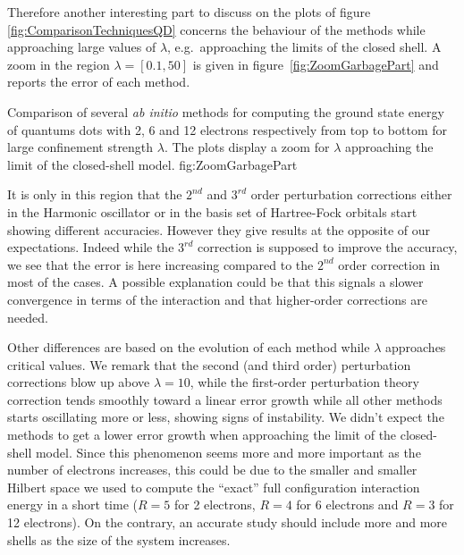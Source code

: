 Therefore another interesting part to discuss on the plots of figure \ref{fig:ComparisonTechniquesQD} concerns the behaviour of the methods while approaching large values of $\lambda$, e.g.\ approaching the limits of the closed shell. A zoom in the region $\lambda=[0.1,50]$ is given in figure~\ref{fig:ZoomGarbagePart} and reports the error of each method.

{Comparison of several \textit{ab initio} methods for computing the ground state energy of quantums dots with 2, 6 and 12 electrons respectively from top to bottom for large confinement strength $\lambda$. The plots display a zoom for $\lambda$ approaching the limit of the closed-shell model.}
{fig:ZoomGarbagePart}


It is only in this region that the $2^{nd}$ and $3^{rd}$ order perturbation corrections either in the Harmonic oscillator or in the basis set of Hartree-Fock orbitals start showing different accuracies. However they give results at the opposite of our expectations. Indeed while the $3^{rd}$ correction is supposed to improve the accuracy, we see that the error is here increasing compared to the $2^{nd}$ order correction in most of the cases. A possible explanation could be that this signals a slower convergence in terms of the interaction and that higher-order corrections are needed.

Other differences are based on the evolution of each method while $\lambda$ approaches critical values. We remark that the second (and third order) perturbation corrections blow up above $\lambda=10$, while the first-order perturbation theory correction tends smoothly toward a linear error growth while all other methods starts oscillating more or less, showing signs of instability. We didn't expect the methods to get a lower error growth when approaching the limit of the closed-shell model. Since this phenomenon seems more and more important as the number of electrons increases, this could  be due to the smaller and smaller Hilbert space we used to compute the ``exact'' full configuration interaction energy in a short time ($R=5$ for 2 electrons, $R=4$ for 6 electrons and $R=3$ for 12 electrons). On the contrary, an accurate study should include more and more shells as the size of the system increases.


